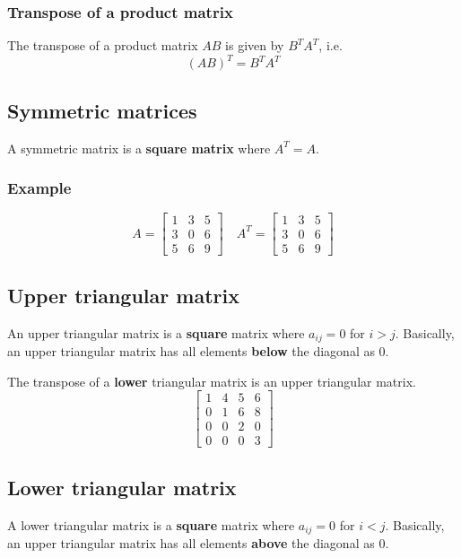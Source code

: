 \documentclass[11pt]{article}
\begin{document}
\subsubsection{Transpose of a product matrix}
\label{sec:orgd7fe0ce}
The transpose of a product matrix \(AB\) is given by \(B^T A^T\), i.e.
\[(AB)^T = B^T A^T\]
\subsection{Symmetric matrices}
\label{sec:org34a06c2}
A symmetric matrix is a \textbf{square matrix} where \(A^T = A\).
\subsubsection{Example}
\label{sec:org9563334}
\begin{displaymath}
A = \begin{bmatrix}
1 & 3 & 5 \\
3 & 0 & 6 \\
5 & 6 & 9
\end{bmatrix} \quad A^T = \begin{bmatrix}
1 & 3 & 5 \\
3 & 0 & 6 \\
5 & 6 & 9
\end{bmatrix}
\end{displaymath}
\subsection{Upper triangular matrix}
\label{sec:org00dcf73}
An upper triangular matrix is a \textbf{square} matrix where \(a_{ij} = 0\) for \(i > j\). Basically, an upper triangular matrix has all elements \textbf{below} the diagonal as 0.

The transpose of a \textbf{lower} triangular matrix is an upper triangular matrix.
\begin{displaymath}
\begin{bmatrix}
1 & 4 & 5 & 6 \\
0 & 1 & 6 & 8 \\
0 & 0 & 2 & 0 \\
0 & 0 & 0 & 3
\end{bmatrix}
\end{displaymath}
\subsection{Lower triangular matrix}
\label{sec:org291f51c}
A lower triangular matrix is a \textbf{square} matrix where \(a_{ij} = 0\) for \(i < j\). Basically, an upper triangular matrix has all elements \textbf{above} the diagonal as 0.
\end{document}
